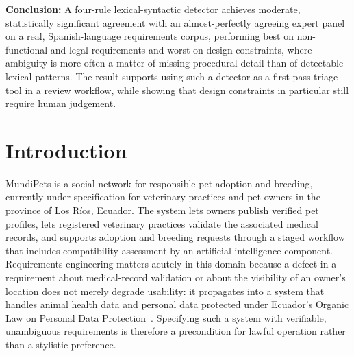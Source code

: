 \documentclass[pdflatex,sn-mathphys-num]{sn-jnl}
\theoremstyle{thmstyleone}%
\theoremstyle{thmstyletwo}%
\theoremstyle{thmstylethree}%
\begin{document}
{		\textbf{Conclusion:} A four-rule lexical-syntactic detector achieves moderate,
		statistically significant agreement with an almost-perfectly agreeing expert
		panel on a real, Spanish-language requirements corpus, performing best on
		non-functional and legal requirements and worst on design constraints, where
		ambiguity is more often a matter of missing procedural detail than of
		detectable lexical patterns. The result supports using such a detector as a
		first-pass triage tool in a review workflow, while showing that design
		constraints in particular still require human judgement.}
	
	
	\maketitle
	
	\section{Introduction}\label{sec:intro}
	
	MundiPets is a social network for responsible pet adoption and breeding,
	currently under specification for veterinary practices and pet owners in the
	province of Los Ríos, Ecuador. The system lets owners publish verified pet
	profiles, lets registered veterinary practices validate the associated medical
	records, and supports adoption and breeding requests through a staged workflow
	that includes compatibility assessment by an artificial-intelligence component.
	Requirements engineering matters acutely in this domain because a defect in a
	requirement about medical-record validation or about the visibility of an
	owner's location does not merely degrade usability: it propagates into a system
	that handles animal health data and personal data protected under Ecuador's
	Organic Law on Personal Data Protection~\cite{lopdp2021}. Specifying such a
	system with verifiable, unambiguous requirements is therefore a precondition for
	lawful operation rather than a stylistic preference.
	
\end{document}
